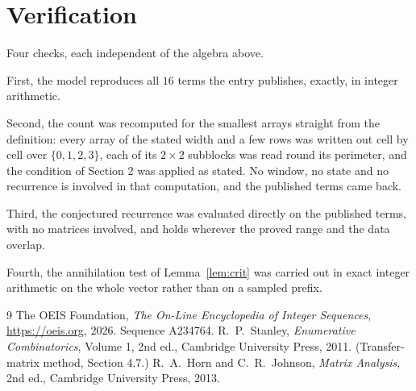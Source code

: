 \documentclass[11pt,a4paper]{article}
\theoremstyle{plain}
\theoremstyle{definition}
\begin{document}
\section{Verification}

Four checks, each independent of the algebra above.

First, the model reproduces all $16$ terms the entry publishes, exactly, in integer
arithmetic.

Second, the count was recomputed for the smallest arrays straight from the definition: every
array of the stated width and a few rows was written out cell by cell over $\{0,1,2,3\}$, each of
its $2\times2$ subblocks was read round its perimeter, and the condition of Section 2 was
applied as stated. No window, no state and no recurrence is involved in that computation, and
the published terms came back.

Third, the conjectured recurrence was evaluated directly on the published terms, with no
matrices involved, and holds wherever the proved range and the data overlap.

Fourth, the annihilation test of Lemma~\ref{lem:crit} was carried out in exact integer
arithmetic on the whole vector rather than on a sampled prefix.

\begin{thebibliography}{9}
 The OEIS Foundation, \emph{The On-Line Encyclopedia of Integer
Sequences}, \url{https://oeis.org}, 2026. Sequence A234764.
 R.~P.~Stanley, \emph{Enumerative Combinatorics}, Volume 1, 2nd ed.,
Cambridge University Press, 2011. (Transfer-matrix method, Section 4.7.)
 R.~A.~Horn and C.~R.~Johnson, \emph{Matrix Analysis}, 2nd ed., Cambridge
University Press, 2013.
\end{thebibliography}
\end{document}
